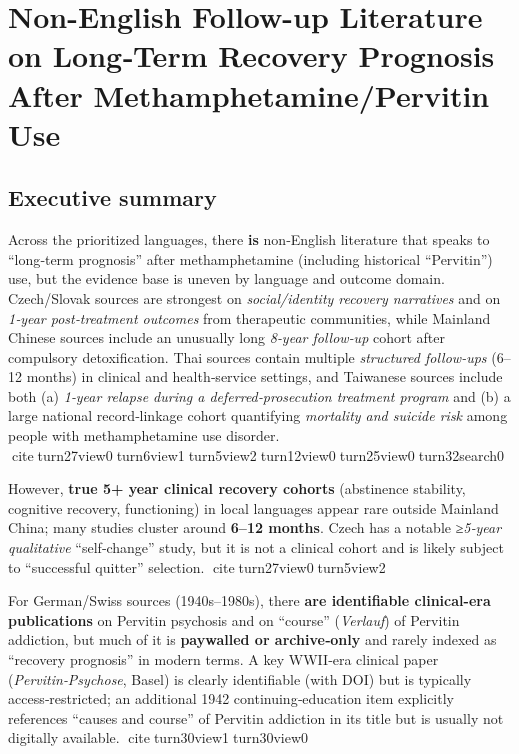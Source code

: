 ﻿\section{Non-English Follow-up Literature on Long‑Term Recovery Prognosis After Methamphetamine/Pervitin Use}\label{13_non_english-non-english-follow-up-literature-on-longterm-recovery-prognosis-after-methamphetaminepervitin-use}

\subsection{Executive summary}\label{13_non_english-executive-summary}

Across the prioritized languages, there \textbf{is} non‑English literature that speaks to ``long‑term prognosis'' after methamphetamine (including historical ``Pervitin'') use, but the evidence base is uneven by language and outcome domain. Czech/Slovak sources are strongest on \emph{social/identity recovery narratives} and on \emph{1‑year post‑treatment outcomes} from therapeutic communities, while Mainland Chinese sources include an unusually long \emph{8‑year follow‑up} cohort after compulsory detoxification. Thai sources contain multiple \emph{structured follow‑ups} (6--12 months) in clinical and health‑service settings, and Taiwanese sources include both (a) \emph{1‑year relapse during a deferred‑prosecution treatment program} and (b) a large national record‑linkage cohort quantifying \emph{mortality and suicide risk} among people with methamphetamine use disorder. citeturn27view0turn6view1turn5view2turn12view0turn25view0turn32search0

However, \textbf{true 5+ year clinical recovery cohorts} (abstinence stability, cognitive recovery, functioning) in local languages appear rare outside Mainland China; many studies cluster around \textbf{6--12 months}. Czech has a notable \emph{≥5‑year qualitative} ``self‑change'' study, but it is not a clinical cohort and is likely subject to ``successful quitter'' selection. citeturn27view0turn5view2

For German/Swiss sources (1940s--1980s), there \textbf{are identifiable clinical-era publications} on Pervitin psychosis and on ``course'' (\emph{Verlauf}) of Pervitin addiction, but much of it is \textbf{paywalled or archive‑only} and rarely indexed as ``recovery prognosis'' in modern terms. A key WWII‑era clinical paper (\emph{Pervitin‑Psychose}, Basel) is clearly identifiable (with DOI) but is typically access‑restricted; an additional 1942 continuing‑education item explicitly references ``causes and course'' of Pervitin addiction in its title but is usually not digitally available. citeturn30view1turn30view0

